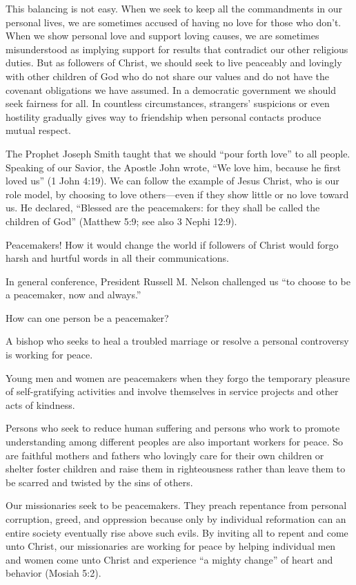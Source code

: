 \documentclass[letterpaper, 11pt]{report}
\begin{document}
This balancing is not easy. When we seek to keep all the commandments in our personal lives, we are sometimes accused of having no love for those who don’t. When we show personal love and support loving causes, we are sometimes misunderstood as implying support for results that contradict our other religious duties. But as followers of Christ, we should seek to live peaceably and lovingly with other children of God who do not share our values and do not have the covenant obligations we have assumed. In a democratic government we should seek fairness for all. In countless circumstances, strangers’ suspicions or even hostility gradually gives way to friendship when personal contacts produce mutual respect.

The Prophet Joseph Smith taught that we should “pour forth love” to all people. Speaking of our Savior, the Apostle John wrote, “We love him, because he first loved us” (1 John 4:19). We can follow the example of Jesus Christ, who is our role model, by choosing to love others—even if they show little or no love toward us. He declared, “Blessed are the peacemakers: for they shall be called the children of God” (Matthew 5:9; see also 3 Nephi 12:9).

Peacemakers! How it would change the world if followers of Christ would forgo harsh and hurtful words in all their communications.

In general conference, President Russell M. Nelson challenged us “to choose to be a peacemaker, now and always.”

How can one person be a peacemaker?

A bishop who seeks to heal a troubled marriage or resolve a personal controversy is working for peace.

Young men and women are peacemakers when they forgo the temporary pleasure of self-gratifying activities and involve themselves in service projects and other acts of kindness.

Persons who seek to reduce human suffering and persons who work to promote understanding among different peoples are also important workers for peace. So are faithful mothers and fathers who lovingly care for their own children or shelter foster children and raise them in righteousness rather than leave them to be scarred and twisted by the sins of others.

Our missionaries seek to be peacemakers. They preach repentance from personal corruption, greed, and oppression because only by individual reformation can an entire society eventually rise above such evils. By inviting all to repent and come unto Christ, our missionaries are working for peace by helping individual men and women come unto Christ and experience “a mighty change” of heart and behavior (Mosiah 5:2).
\end{document}

